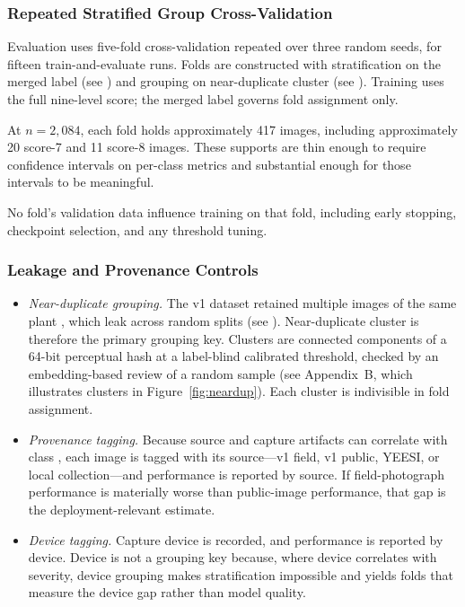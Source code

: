\documentclass{icsthesis}
\newcommand{\secref}[1]{\textit{\nameref{#1}}}
\begin{document}
\begin{mainmatter}
				\subsubsection{Repeated Stratified Group Cross-Validation}\label{sec:cv}

					Evaluation uses five-fold cross-validation repeated over three random seeds, for
					fifteen train-and-evaluate runs. Folds are constructed with stratification on
					the merged label (see \secref{sec:merge}) and grouping on near-duplicate cluster
					(see \secref{sec:leakctrl}). Training uses the full nine-level score; the merged
					label governs fold assignment only.

					At $n = 2{,}084$, each fold holds approximately 417 images, including
					approximately 20 score-7 and 11 score-8 images. These supports are thin enough
					to require confidence intervals on per-class metrics and substantial enough for
					those intervals to be meaningful.

					No fold's validation data influence training on that fold, including early
					stopping, checkpoint selection, and any threshold tuning.

				\subsubsection{Leakage and Provenance Controls}\label{sec:leakctrl}

					\begin{itemize}
						\item \textit{Near-duplicate grouping.} The v1 dataset retained
						multiple images of the same plant \citep{casasola2026}, which leak across random splits (see \secref{sec:leakage}).
						Near-duplicate cluster is therefore the primary grouping key.
						Clusters are connected components of a 64-bit perceptual hash at
						a label-blind calibrated threshold, checked by an embedding-based review of a random sample (see Appendix~B, which illustrates clusters in Figure~\ref{fig:neardup}). Each
						cluster is indivisible in fold assignment.
						\item \textit{Provenance tagging.} Because source and capture artifacts can
							correlate with class \citep{noyan2022}, each image is tagged with its
							source---v1 field, v1 public, YEESI, or local collection---and
							performance is reported by source. If field-photograph performance is materially worse
							than public-image performance, that gap is the deployment-relevant
							estimate.
						\item \textit{Device tagging.} Capture device is recorded, and performance is reported by device. Device is not a grouping key because,
							where device correlates with severity, device grouping makes
							stratification impossible and yields folds that measure the device gap
							rather than model quality.
					\end{itemize}


\end{mainmatter}
\end{document}
